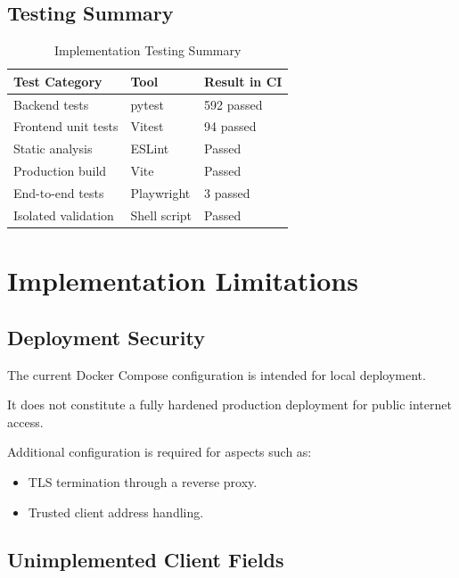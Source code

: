 \documentclass[11pt,a4paper]{article}
\begin{document}
\subsection{Testing Summary}

\begin{table}[htbp]
\centering
\caption{Implementation Testing Summary}
\label{tab:phase3_testing}
\small
\begin{tabularx}{\textwidth}{P{4cm} P{3cm} L}
\toprule
\textbf{Test Category} & \textbf{Tool} & \textbf{Result in CI} \\
\midrule
Backend tests & pytest & 592 passed \\
Frontend unit tests & Vitest & 94 passed \\
Static analysis & ESLint & Passed \\
Production build & Vite & Passed \\
End-to-end tests & Playwright & 3 passed \\
Isolated validation & Shell script & Passed \\
\bottomrule
\end{tabularx}
\end{table}


\section{Implementation Limitations}

\subsection{Deployment Security}

The current Docker Compose configuration
is intended for local deployment.

It does not constitute a fully hardened
production deployment for public
internet access.

Additional configuration is required
for aspects such as:

\begin{itemize}
    \item TLS termination through a reverse proxy.
    \item Trusted client address handling.
\end{itemize}

\subsection{Unimplemented Client Fields}
\end{document}
